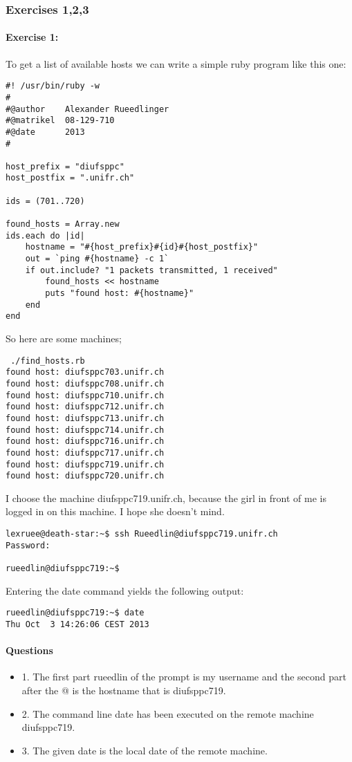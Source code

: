 \documentclass[12pt]{article}
\begin{document}
\subsubsection*{Exercises 1,2,3}
\paragraph*{Exercise 1:}

To get a list of available hosts we can write a simple ruby program like this one:
\begin{lstlisting}
#! /usr/bin/ruby -w
#
#@author	Alexander Rueedlinger
#@matrikel	08-129-710
#@date		2013
#

host_prefix = "diufsppc"
host_postfix = ".unifr.ch"

ids = (701..720)

found_hosts = Array.new
ids.each do |id|
	hostname = "#{host_prefix}#{id}#{host_postfix}"
	out = `ping #{hostname} -c 1`
	if out.include? "1 packets transmitted, 1 received"
		found_hosts << hostname
		puts "found host: #{hostname}"	
	end
end
\end{lstlisting}

So here are some machines;
\begin{lstlisting}
 ./find_hosts.rb
found host: diufsppc703.unifr.ch
found host: diufsppc708.unifr.ch
found host: diufsppc710.unifr.ch
found host: diufsppc712.unifr.ch
found host: diufsppc713.unifr.ch
found host: diufsppc714.unifr.ch
found host: diufsppc716.unifr.ch
found host: diufsppc717.unifr.ch
found host: diufsppc719.unifr.ch
found host: diufsppc720.unifr.ch
\end{lstlisting}

I choose the machine diufsppc719.unifr.ch, because the girl in front of me is logged in on this machine. I hope she doesn't mind.

\begin{lstlisting}
lexruee@death-star:~$ ssh Rueedlin@diufsppc719.unifr.ch
Password:

rueedlin@diufsppc719:~$ 
\end{lstlisting}

Entering the date command yields the following output:
\begin{lstlisting}
rueedlin@diufsppc719:~$ date
Thu Oct  3 14:26:06 CEST 2013
\end{lstlisting}

\paragraph{Questions}
\begin{itemize}
\item 1. The first part rueedlin of the prompt is my username and the second part after the @ is the hostname that is diufsppc719.
\item 2. The command line date has been executed on the remote machine diufsppc719.
\item 3. The given date is the local date of the remote machine.
\end{itemize}
\end{document}
